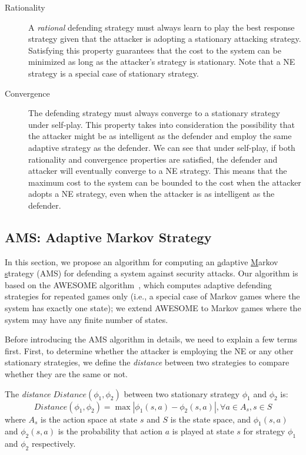 \begin{description}
\item[Rationality] A \emph{rational} defending strategy must always learn to play the best response strategy given that the attacker is adopting a stationary attacking strategy. Satisfying this property guarantees that the cost to the system can be minimized as long as the attacker's strategy is stationary. Note that a NE strategy is a special case of stationary strategy.

\item[Convergence] The defending strategy must always converge to a stationary strategy under self-play.  This property takes into consideration the possibility that the attacker might be as intelligent as the defender and employ the same adaptive strategy as the defender. We can see that under self-play, if both rationality and convergence properties are satisfied, the defender and attacker will eventually converge to a NE strategy. This means that the maximum cost to the system can be bounded to the cost when the attacker adopts a NE strategy, even when the attacker is as intelligent as the defender.
\end{description}

\subsection{AMS: Adaptive Markov Strategy}

In this section, we propose an algorithm for computing an \underline{a}daptive \underline{M}arkov \underline{s}trategy (AMS) for defending a system against security attacks. Our algorithm is based on the AWESOME algorithm~\cite{conitzer2007awesome}, which computes adaptive defending strategies for repeated games only (i.e., a special case of Markov games where the system has exactly one state); we extend AWESOME to Markov games where the system may have any finite number of states.  

Before introducing the AMS algorithm in details, we need to explain a few terms first. First, to determine whether the attacker is employing the NE or any other stationary strategies, we define the \emph{distance} between two strategies to compare whether they are the same or not. 

\begin{definition}
The \emph{distance} $Distance(\phi_1, \phi_2)$ between two stationary strategy $\phi_1$ and $\phi_2$ is: 
\begin{equation}
Distance(\phi_1, \phi_2) = \max|\phi_1(s,a) - \phi_2(s,a)|, \forall a\in A_s, s\in S
\end{equation}
where $A_s$ is the action space at state $s$ and $S$ is the state space, and $\phi_1(s,a)$ and $\phi_2(s,a)$ is the probability that action $a$ is played at state $s$ for strategy $\phi_1$ and $\phi_2$ respectively.
\end{definition}


